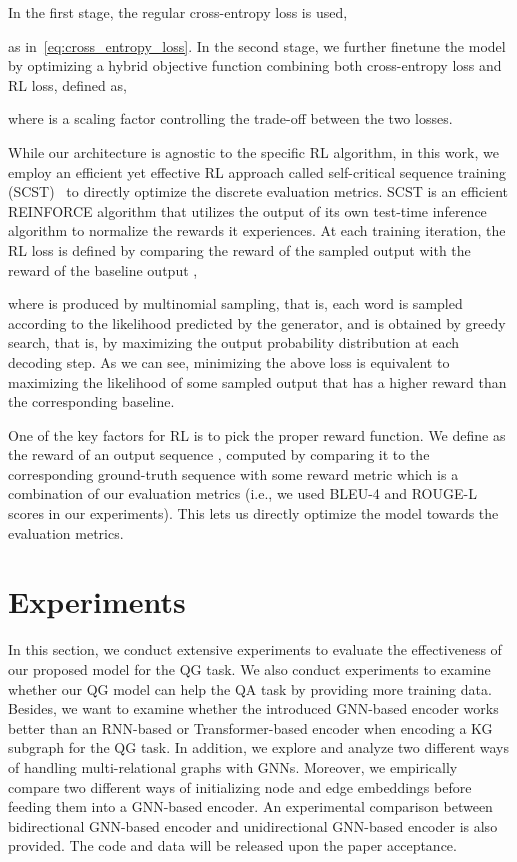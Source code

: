 \documentclass[journal]{IEEEtran}
\begin{document}
In the first stage, the regular cross-entropy loss is used,

as in~\cref{eq:cross_entropy_loss}. 
In the second stage, we further finetune the model by optimizing a hybrid objective function combining both cross-entropy loss and RL loss, defined as,

where  is a scaling factor controlling the trade-off between the two losses.



While our architecture is agnostic to the specific RL algorithm, in this work, 
we employ an efficient yet effective RL approach called self-critical sequence training (SCST)~\cite{rennie2017self}
to directly optimize the discrete evaluation metrics. 
SCST is an efficient REINFORCE algorithm that utilizes the output of its own test-time inference algorithm to normalize the rewards it experiences.
At each training iteration,
the RL loss is defined by comparing the reward of the sampled output 
with the reward of the baseline output , 

where  is produced by multinomial sampling, that is, each word  is sampled according to the likelihood  predicted by the generator,
and  is obtained by greedy search, that is, by maximizing the output probability distribution at each decoding step.
As we can see,  minimizing the above loss is equivalent to maximizing the likelihood of some sampled output that has a higher reward than the corresponding baseline. 


One of the key factors for RL is to pick the proper reward function.
We define  as the reward of an output sequence , computed by comparing it to the corresponding ground-truth sequence  with some reward metric which is 
a combination of our evaluation metrics (i.e., we used BLEU-4 and ROUGE-L scores in our experiments).
This lets us directly optimize the model towards the evaluation metrics.














\section{Experiments}

In this section, we conduct extensive experiments to evaluate the effectiveness of our proposed model for the QG task.
We also conduct experiments to examine whether our QG model can help the QA task by providing more training data.
Besides, we want to examine whether the introduced GNN-based encoder works better than an RNN-based or Transformer-based encoder when encoding a KG subgraph for the QG task.
In addition, we explore and analyze two different ways of handling multi-relational graphs with GNNs.
Moreover, we empirically compare two different ways of initializing node and edge embeddings before feeding them into a GNN-based encoder.
An experimental comparison between bidirectional GNN-based encoder and unidirectional GNN-based encoder is also provided.
The code and data will be released upon the paper acceptance.
\end{document}
